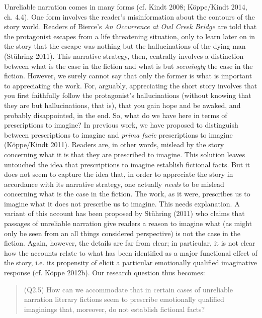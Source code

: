 Unreliable narration comes in many forms (cf. Kindt 2008; K\"oppe/Kindt
2014, ch. 4.4). One form involves the reader's misinformation about the
contours of the story world. Readers of Bierce's \emph{An Occurrence at
Owl Creek Bridge} are told that the protagonist escapes from a life
threatening situation, only to learn later on in the story that the
escape was nothing but the hallucinations of the dying man (St\"uhring
2011). This narrative strategy, then, centrally involves a distinction
between what is the case in the fiction and what is but \emph{seemingly}
the case in the fiction. However, we surely cannot say that only the
former is what is important to appreciating the work. For, arguably,
appreciating the short story involves that you first faithfully follow
the protagonist's hallucinations (without knowing that they are but
hallucinations, that is), that you gain hope and be awaked, and probably
disappointed, in the end. So, what do we have here in terms of
prescriptions to imagine? In previous work, we have proposed to
distinguish between prescriptions to imagine and \emph{prima facie}
prescriptions to imagine (K\"oppe/Kindt 2011). Readers are, in other
words, mislead by the story concerning what it is that they are
prescribed to imagine. This solution leaves untouched the idea that
prescriptions to imagine establish fictional facts. But it does not seem
to capture the idea that, in order to appreciate the story in accordance
with its narrative strategy, one actually \emph{needs} to be mislead
concerning what is the case in the fiction. The work, as it were,
prescribes us to imagine what it does not prescribe us to imagine. This
needs explanation. A variant of this account has been proposed by
St\"uhring (2011) who claims that passages of unreliable narration give
readers a reason to imagine what (as might only be seen from an all
things considered perspective) is not the case in the fiction. Again,
however, the details are far from clear; in particular, it is not clear
how the accounts relate to what has been identified as a major
functional effect of the story, i.e. its propensity of elicit a
particular emotionally qualified imaginative response (cf. K\"oppe 2012b).
Our research question thus becomes:

\vspace{-.2cm}
\begin{quote}
(Q2.5)  How can we accommodate that in certain cases of unreliable
narration literary fictions seem  to prescribe emotionally qualified
imaginings that, moreover, do not establish fictional facts?
\end{quote}
\vspace{-.2cm}


